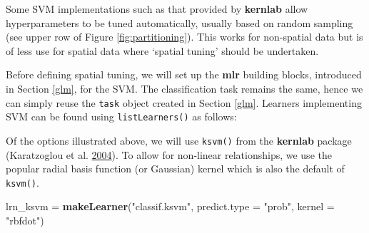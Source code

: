 \documentclass[]{krantz}
\newenvironment{Shaded}{\begin{snugshade}}{\end{snugshade}}
\newcommand{\CommentTok}[1]{\textcolor[rgb]{0.37,0.37,0.37}{\textit{#1}}}
\newcommand{\DataTypeTok}[1]{\textcolor[rgb]{0.27,0.27,0.27}{#1}}
\newcommand{\KeywordTok}[1]{\textcolor[rgb]{0.27,0.27,0.27}{\textbf{#1}}}
\newcommand{\NormalTok}[1]{#1}
\newcommand{\OperatorTok}[1]{\textcolor[rgb]{0.43,0.43,0.43}{\textbf{#1}}}
\newcommand{\OtherTok}[1]{\textcolor[rgb]{0.37,0.37,0.37}{#1}}
\newcommand{\StringTok}[1]{\textcolor[rgb]{0.5,0.5,0.5}{#1}}
\begin{document}
Some SVM implementations such as that provided by \textbf{kernlab} allow hyperparameters to be tuned automatically, usually based on random sampling (see upper row of Figure \ref{fig:partitioning}).
This works for non-spatial data but is of less use for spatial data where `spatial tuning' should be undertaken.

Before defining spatial tuning, we will set up the \textbf{mlr} building blocks, introduced in Section \ref{glm}, for the SVM.
The classification task remains the same, hence we can simply reuse the \texttt{task} object created in Section \ref{glm}.
Learners implementing SVM can be found using \texttt{listLearners()} as follows:

\begin{Shaded}
\end{Shaded}

Of the options illustrated above, we will use \texttt{ksvm()} from the \textbf{kernlab} package (Karatzoglou et al. \protect\hyperlink{ref-karatzoglou_kernlab_2004}{2004}).
To allow for non-linear relationships, we use the popular radial basis function (or Gaussian) kernel which is also the default of \texttt{ksvm()}.

\begin{Shaded}
\begin{Highlighting}[]
\NormalTok{lrn_ksvm =}\StringTok{ }\KeywordTok{makeLearner}\NormalTok{(}\StringTok{"classif.ksvm"}\NormalTok{,}
                        \DataTypeTok{predict.type =} \StringTok{"prob"}\NormalTok{,}
                        \DataTypeTok{kernel =} \StringTok{"rbfdot"}\NormalTok{)}
\end{Highlighting}
\end{Shaded}
\end{document}
